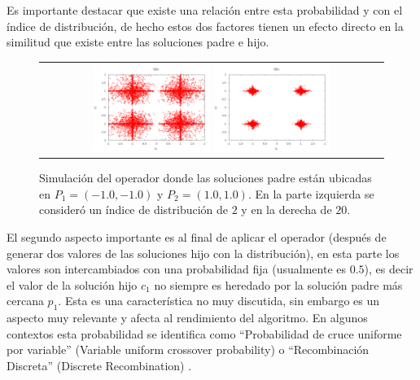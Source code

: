 %
Es importante destacar que existe una relación entre esta probabilidad y con el índice de distribución, de hecho estos dos factores tienen un efecto directo en la similitud que existe entre las soluciones padre e hijo.
%
%
\begin{figure}[t]
\centering
\begin{tabular}{c}
   \includegraphics[width=0.35\textwidth]{img/Operadores/SBX_eta_2.png}  %
   \includegraphics[width=0.35\textwidth]{img/Operadores/SBX_eta_20.png} 
\end{tabular}
\caption{Simulación del operador \SBX{} donde las soluciones padre están ubicadas en $P_1=(-1.0, -1.0)$ y $P_2=(1.0, 1.0)$. En la parte izquierda se consideró un índice de distribución de $2$ y en la derecha de $20$.}
\label{fig:Simulation_Case_3}
\end{figure}

El segundo aspecto importante es al final de aplicar el operador \SBX{} (después de generar dos valores de las soluciones hijo con la distribución), en esta parte los valores son intercambiados con una probabilidad fija (usualmente es $0.5$), es decir el valor de la solución hijo $c_1$ no siempre es heredado por la solución padre más cercana $p_1$.
%
Esta es una característica no muy discutida, sin embargo es un aspecto muy relevante y afecta al rendimiento del algoritmo.
%
En algunos contextos esta probabilidad se identifica como ``Probabilidad de cruce uniforme por variable'' (Variable uniform crossover probability) \cite{tuvsar2007differential} o ``Recombinación Discreta'' (Discrete Recombination) \cite{muhlenbein1993predictive}.

